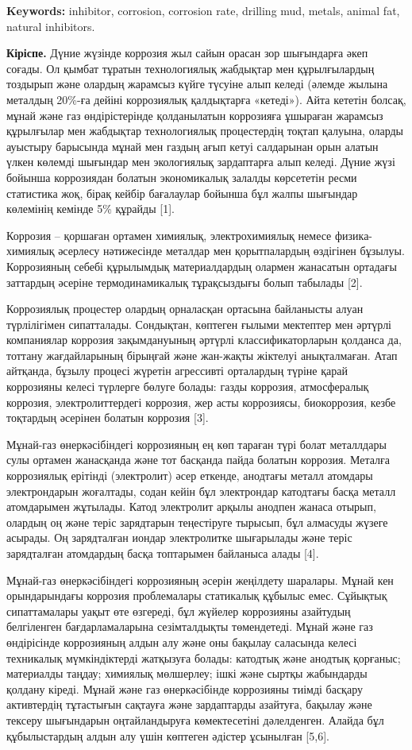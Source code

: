 {\bfseries Keywords:} inhibitor, corrosion, corrosion rate, drilling mud,
metals, animal fat, natural inhibitors.
\begin{multicols}{2}

{\bfseries Кіріспе.} Дүние жүзінде коррозия жыл сайын орасан зор шығындарға
әкеп соғады. Ол қымбат тұратын технологиялық жабдықтар мен құрылғылардың
тоздырып және олардың жарамсыз күйге түсуіне алып келеді (әлемде жылына
металдың 20\%-ға дейіні коррозиялық қалдықтарға «кетеді»). Айта кететін
болсақ, мұнай және газ өндірістерінде қолданылатын коррозияға ұшыраған
жарамсыз құрылғылар мен жабдықтар технологиялық процестердің тоқтап
қалуына, оларды ауыстыру барысында мұнай мен газдың ағып кетуі
салдарынан орын алатын үлкен көлемді шығындар мен экологиялық
зардаптарға алып келеді. Дүние жүзі бойынша коррозиядан болатын
экономикалық залалды көрсететін ресми статистика жоқ, бірақ кейбір
бағалаулар бойынша бұл жалпы шығындар көлемінің кемінде 5\% құрайды
{[}1{]}.

Коррозия -- қоршаған ортамен химиялық, электрохимиялық немесе
физика-химиялық әсерлесу нәтижесінде металдар мен қорытпалардың
өздігінен бұзылуы. Коррозияның себебі құрылымдық материалдардың олармен
жанасатын ортадағы заттардың әсеріне термодинамикалық тұрақсыздығы болып
табылады {[}2{]}.

Коррозиялық процестер олардың орналасқан ортасына байланысты алуан
түрлілігімен сипатталады. Сондықтан, көптеген ғылыми мектептер мен
әртүрлі компаниялар коррозия зақымдануының әртүрлі классификаторларын
қолданса да, тоттану жағдайларының бірыңғай және жан-жақты жіктелуі
анықталмаған. Атап айтқанда, бұзылу процесі жүретін агрессивті
орталардың түріне қарай коррозияны келесі түрлерге бөлуге болады: газды
коррозия, атмосфералық коррозия, электролиттердегі коррозия, жер асты
коррозиясы, биокоррозия, кезбе тоқтардың әсерінен болатын коррозия
{[}3{]}.

Мұнай-газ өнеркәсібіндегі коррозияның ең көп тараған түрі болат
металлдары сулы ортамен жанасқанда және тот басқанда пайда болатын
коррозия. Металға коррозиялық ерітінді (электролит) әсер еткенде,
анодтағы металл атомдары электрондарын жоғалтады, содан кейін бұл
электрондар катодтағы басқа металл атомдарымен жұтылады. Катод
электролит арқылы анодпен жанаса отырып, олардың оң және теріс
зарядтарын теңестіруге тырысып, бұл алмасуды жүзеге асырады. Оң
зарядталған иондар электролитке шығарылады және теріс зарядталған
атомдардың басқа топтарымен байланыса алады {[}4{]}.

Мұнай-газ өнеркәсібіндегі коррозияның әсерін жеңілдету шаралары. Мұнай
кен орындарындағы коррозия проблемалары статикалық құбылыс емес.
Сұйықтық сипаттамалары уақыт өте өзгереді, бұл жүйелер коррозияны
азайтудың белгіленген бағдарламаларына сезімталдықты төмендетеді. Мұнай
және газ өндірісінде коррозияның алдын алу және оны бақылау саласында
келесі техникалық мүмкіндіктерді жатқызуға болады: катодтық және анодтық
қорғаныс; материалды таңдау; химиялық мөлшерлеу; ішкі және сыртқы
жабындарды қолдану кіреді. Мұнай және газ өнеркәсібінде коррозияны
тиімді басқару активтердің тұтастығын сақтауға және зардаптарды
азайтуға, бақылау және тексеру шығындарын оңтайландыруға көмектесетіні
дәлелденген. Алайда бұл құбылыстардың алдын алу үшін көптеген әдістер
ұсынылған {[}5,6{]}.


\end{multicols}
